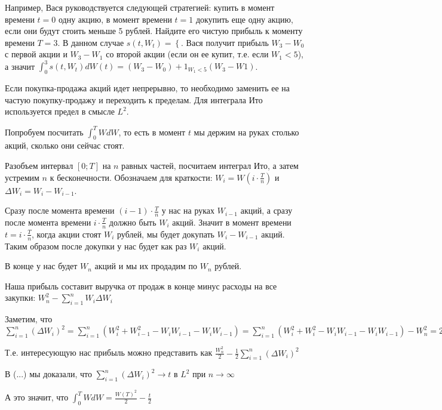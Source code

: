 {\begin{myex} Например, Вася руководствуется следующей стратегией: купить в момент времени $t=0$ одну акцию, в момент времени $t=1$ докупить еще одну акцию, если они будут стоить меньше 5 рублей. Найдите его чистую прибыль к моменту времени $T=3$. В данном случае $s(t,W_{t})=\left\{ \right.$. Вася получит прибыль $W_{3}-W_{0}$ с первой акции и $W_{3}-W_{1}$ со второй акции (если он ее купит, т.е. если $W_{1}<5$), а значит $\int_{0}^{3}s(t,W_{t})dW(t)=(W_{3}-W_{0})+1_{W_{1}<5}(W_{3}-W{1})$.
\end{myex}

Если покупка-продажа акций идет непрерывно, то необходимо заменить ее на частую покупку-продажу и переходить к пределам. Для интеграла Ито используется предел в смысле $L^{2}$.

\begin{myex} Попробуем посчитать $\int_{0}^{T}WdW$, то есть в момент $t$ мы держим на руках столько акций, сколько они сейчас стоят.

Разобъем интервал $[0;T]$ на $n$ равных частей, посчитаем интеграл Ито, а затем устремим $n$ к бесконечности.
Обозначаем для краткости: $W_{i}=W(i\cdot \frac{T}{n})$ и $\Delta W_{i}=W_{i}-W_{i-1}$.

Сразу после момента времени $(i-1)\cdot \frac{T}{n}$ у нас на руках $W_{i-1}$ акций, а сразу после момента времени $i\cdot \frac{T}{n}$ должно быть $W_{i}$ акций. Значит в момент времени $t=i\cdot \frac{T}{n}$, когда акции стоят $W_{i}$ рублей, мы будет докупать $W_{i}-W_{i-1}$ акций. Таким образом после докупки у нас будет как раз $W_{i}$ акций. \par
В конце у нас будет $W_{n}$ акций и мы их продадим по $W_{n}$ рублей. \par
Наша прибыль составит выручка от продаж в конце минус расходы на все закупки: $W_{n}^{2}-\sum_{i=1}^{n}W_{i}\Delta W_{i}$ \par
Заметим, что $\sum_{i=1}^{n}(\Delta W_{i})^{2}=\sum_{i=1}^{n}(W_{i}^{2}+W_{i-1}^{2}-W_{i}W_{i-1}-W_{i}W_{i-1})=\sum_{i=1}^{n}(W_{i}^{2}+W_{i}^{2}-W_{i}W_{i-1}-W_{i}W_{i-1})-W_{n}^{2}=2\sum_{i=1}^{n}W_{i}\Delta W_{i}-W_{n}^{2}$ \par
Т.е. интересующую нас прибыль можно представить как $\frac{W_{n}^{2}}{2}-\frac{1}{2}\sum_{i=1}^{n}(\Delta W_{i})^{2}$ \par
В (...) мы доказали, что $\sum_{i=1}^{n}(\Delta W_{i})^{2}\to t$ в $L^{2}$ при $n\to\infty$ \par
А это значит, что $\int_{0}^{T}WdW=\frac{W(T)^{2}}{2}-\frac{t}{2}$ \par
\end{myex}


}
